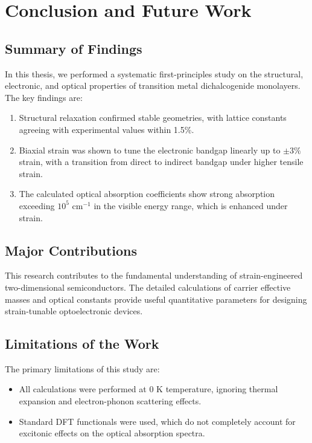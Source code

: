 \chapter{Conclusion and Future Work}
\label{ch:conclusion}

\section{Summary of Findings}
In this thesis, we performed a systematic first-principles study on the structural, electronic, and optical properties of transition metal dichalcogenide monolayers. The key findings are:
\begin{enumerate}
    \item Structural relaxation confirmed stable geometries, with lattice constants agreeing with experimental values within 1.5\%.
    \item Biaxial strain was shown to tune the electronic bandgap linearly up to $\pm 3\%$ strain, with a transition from direct to indirect bandgap under higher tensile strain.
    \item The calculated optical absorption coefficients show strong absorption exceeding $10^5$ cm$^{-1}$ in the visible energy range, which is enhanced under strain.
\end{enumerate}

\section{Major Contributions}
This research contributes to the fundamental understanding of strain-engineered two-dimensional semiconductors. The detailed calculations of carrier effective masses and optical constants provide useful quantitative parameters for designing strain-tunable optoelectronic devices.

\section{Limitations of the Work}
The primary limitations of this study are:
\begin{itemize}
    \item All calculations were performed at $0$ K temperature, ignoring thermal expansion and electron-phonon scattering effects.
    \item Standard DFT functionals were used, which do not completely account for excitonic effects on the optical absorption spectra.
\end{itemize}

